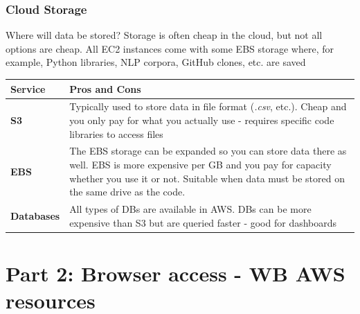 \documentclass[aspectratio=169]{beamer} %
\begin{document}
\begin{frame}
	\frametitle{Cloud Storage}

	Where will data be stored? Storage is often cheap in the cloud,
	but not all options are cheap.
	All EC2 instances come with some EBS storage where,
	for example, Python libraries, NLP corpora,  GitHub clones, etc. are saved
	\vspace{-.5cm}
	\begin{table}
		\begin{tabular}{p{}p{}}
			Service & Pros and Cons\\
			\hline \hline
			\textbf{S3} & Typically used to store data in file format (\textit{.csv}, etc.).
			Cheap and you only pay for what you actually use
			- requires specific code libraries to access files\\[.2cm]
			\textbf{EBS} & The EBS storage can be expanded so you can store data there as well.
			EBS is more expensive per GB and you pay for capacity whether you use it or not.
			Suitable when data must be stored on the same drive as the code.\\[.2cm]
			\textbf{Databases} & All types of DBs are available in AWS.
			DBs can be more expensive than S3 but are queried faster
			- good for dashboards
		\end{tabular}
	\end{table}
\end{frame}

\section{Part 2: Browser access - WB AWS resources}
\end{document}
